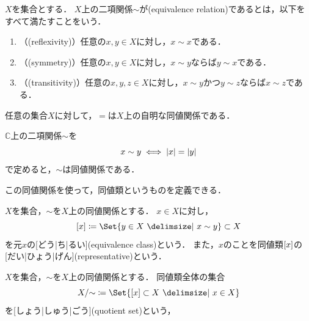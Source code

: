 \documentclass[../sotsu.tex]{subfiles}
\begin{document}
\begin{definition}[同値関係]
    \label{dfn:equivalence-relation}
    $X$を集合とする．
    $X$上の二項関係$\sim$が(equivalence relation)であるとは，以下をすべて満たすことをいう．
    \begin{enumerate}
        \item （(reflexivity)）任意の$x, y \in X$に対し，$x \sim x$である．
        \item （(symmetry)）任意の$x, y \in X$に対し，$x \sim y$ならば$y \sim x$である．
        \item （(transitivity)）任意の$x, y, z \in X$に対し，$x \sim y$かつ$y \sim z$ならば$x \sim z$である．
    \end{enumerate}
\end{definition}

\begin{example}
    任意の集合$X$に対して，$=$は$X$上の自明な同値関係である．
\end{example}

\begin{example}
    $ℂ$上の二項関係$\sim$を
    \begin{equation*}
        x \sim y  \iff  \lvert x\rvert = \lvert y\rvert
    \end{equation*}
    で定めると，$\sim$は同値関係である．
\end{example}


この同値関係を使って，同値類というものを定義できる．

\begin{definition}[同値類]
    \label{dfn:equivalence-class}
    $X$を集合，$\sim$を$X$上の同値関係とする．
    $x \in X$に対し，
    \begin{equation}
        \eqclass{x}  \coloneq  \Set{ y \in X  \given  x \sim y } \subset X
    \end{equation}
    を元$x$の[どう|ち|るい](equivalence class)という．
    また，$x$のことを同値類$\lbrack x\rbrack$の[だい|ひょう|げん](representative)という．
\end{definition}

\begin{definition}[商集合]
    \label{dfn:quotient-set}
    $X$を集合，$\sim$を$X$上の同値関係とする．
    同値類全体の集合
    \begin{equation}
        X/{\sim} \coloneq \Set{ \eqclass{x} \subset X  \given  x \in X }
    \end{equation}
    を[しょう|しゅう|ごう](quotient set)という，
\end{definition}
\end{document}
